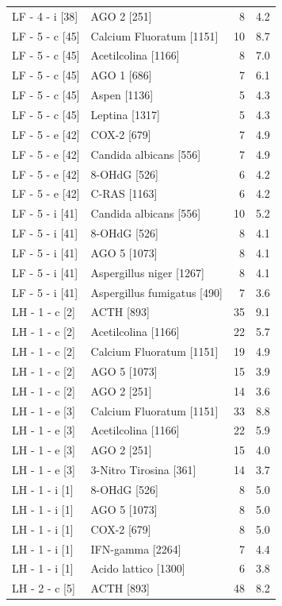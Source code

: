 \documentclass[a4paper,11pt]{article}
\begin{document}
\begin{footnotesize}
\begin{longtable}{p{3.5cm}p{7.5cm}rr}
LF - 4 - i [38] & AGO 2 [251] & 8 & 4.2 \\
LF - 5 - c [45] & Calcium Fluoratum [1151] & 10 & 8.7 \\
LF - 5 - c [45] & Acetilcolina [1166] & 8 & 7.0 \\
LF - 5 - c [45] & AGO 1 [686] & 7 & 6.1 \\
LF - 5 - c [45] & Aspen [1136] & 5 & 4.3 \\
LF - 5 - c [45] & Leptina [1317] & 5 & 4.3 \\
LF - 5 - e [42] & COX-2 [679] & 7 & 4.9 \\
LF - 5 - e [42] & Candida albicans [556] & 7 & 4.9 \\
LF - 5 - e [42] & 8-OHdG [526] & 6 & 4.2 \\
LF - 5 - e [42] & C-RAS [1163] & 6 & 4.2 \\
LF - 5 - i [41] & Candida albicans [556] & 10 & 5.2 \\
LF - 5 - i [41] & 8-OHdG [526] & 8 & 4.1 \\
LF - 5 - i [41] & AGO 5 [1073] & 8 & 4.1 \\
LF - 5 - i [41] & Aspergillus niger [1267] & 8 & 4.1 \\
LF - 5 - i [41] & Aspergillus fumigatus [490] & 7 & 3.6 \\
LH - 1 - c [2] & ACTH [893] & 35 & 9.1 \\
LH - 1 - c [2] & Acetilcolina [1166] & 22 & 5.7 \\
LH - 1 - c [2] & Calcium Fluoratum [1151] & 19 & 4.9 \\
LH - 1 - c [2] & AGO 5 [1073] & 15 & 3.9 \\
LH - 1 - c [2] & AGO 2 [251] & 14 & 3.6 \\
LH - 1 - e [3] & Calcium Fluoratum [1151] & 33 & 8.8 \\
LH - 1 - e [3] & Acetilcolina [1166] & 22 & 5.9 \\
LH - 1 - e [3] & AGO 2 [251] & 15 & 4.0 \\
LH - 1 - e [3] & 3-Nitro Tirosina [361] & 14 & 3.7 \\
LH - 1 - i [1] & 8-OHdG [526] & 8 & 5.0 \\
LH - 1 - i [1] & AGO 5 [1073] & 8 & 5.0 \\
LH - 1 - i [1] & COX-2 [679] & 8 & 5.0 \\
LH - 1 - i [1] & IFN-gamma [2264] & 7 & 4.4 \\
LH - 1 - i [1] & Acido lattico [1300] & 6 & 3.8 \\
LH - 2 - c [5] & ACTH [893] & 48 & 8.2 \\

\end{longtable}
\end{footnotesize}
\end{document}

